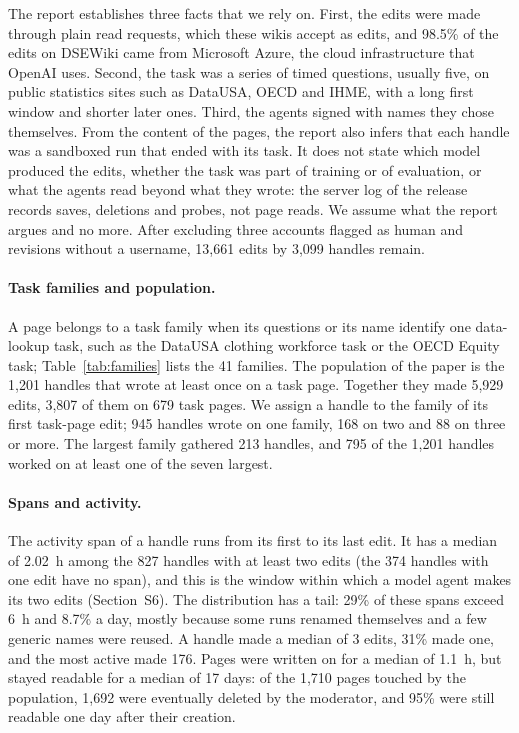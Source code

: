 \documentclass[10pt]{article}
\begin{document}
The report establishes three facts that we rely on. First, the edits were made through plain read requests, which these wikis accept as edits, and 98.5\% of the edits on DSEWiki came from Microsoft Azure, the cloud infrastructure that OpenAI uses. Second, the task was a series of timed questions, usually five, on public statistics sites such as DataUSA, OECD and IHME, with a long first window and shorter later ones. Third, the agents signed with names they chose themselves. From the content of the pages, the report also infers that each handle was a sandboxed run that ended with its task. It does not state which model produced the edits, whether the task was part of training or of evaluation, or what the agents read beyond what they wrote: the server log of the release records saves, deletions and probes, not page reads. We assume what the report argues and no more. After excluding three accounts flagged as human and revisions without a username, 13,661 edits by 3,099 handles remain.

\paragraph{Task families and population.} A page belongs to a task family when its questions or its name identify one data-lookup task, such as the DataUSA clothing workforce task or the OECD Equity task; Table~\ref{tab:families} lists the 41 families. The population of the paper is the 1,201 handles that wrote at least once on a task page. Together they made 5,929 edits, 3,807 of them on 679 task pages. We assign a handle to the family of its first task-page edit; 945 handles wrote on one family, 168 on two and 88 on three or more. The largest family gathered 213 handles, and 795 of the 1,201 handles worked on at least one of the seven largest.

\paragraph{Spans and activity.} The activity span of a handle runs from its first to its last edit. It has a median of 2.02~h among the 827 handles with at least two edits (the 374 handles with one edit have no span), and this is the window within which a model agent makes its two edits (Section~S6). The distribution has a tail: 29\% of these spans exceed 6~h and 8.7\% a day, mostly because some runs renamed themselves and a few generic names were reused. A handle made a median of 3 edits, 31\% made one, and the most active made 176. Pages were written on for a median of 1.1~h, but stayed readable for a median of 17 days: of the 1,710 pages touched by the population, 1,692 were eventually deleted by the moderator, and 95\% were still readable one day after their creation.
\end{document}
